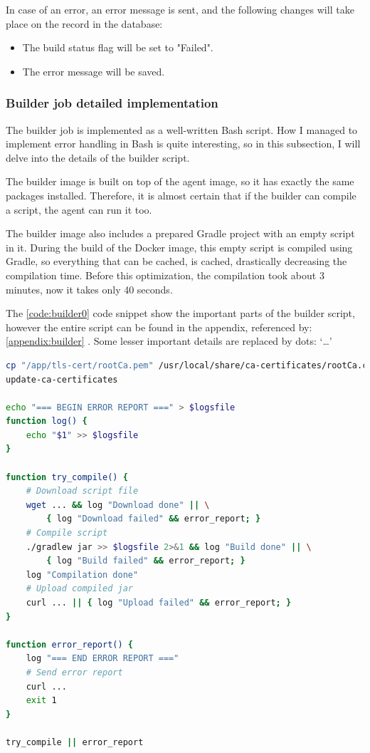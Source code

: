 In case of an error, an error message is sent, and the following changes will take place on the record in the database:

\begin{itemize}
    \item The build status flag will be set to "Failed".
    \item The error message will be saved.
\end{itemize}

\subsubsection{Builder job detailed implementation}

The builder job is implemented as a well-written Bash script. How I managed to implement error handling in Bash is quite interesting, so in this subsection, I will delve into the details of the builder script.

The builder image is built on top of the agent image, so it has exactly the same packages installed. Therefore, it is almost certain that if the builder can compile a script, the agent can run it too.

The builder image also includes a prepared Gradle project with an empty script in it. During the build of the Docker image, this empty script is compiled using Gradle, so everything that can be cached, is cached, drastically decreasing the compilation time. Before this optimization, the compilation took about 3 minutes, now it takes only 40 seconds.

The \ref{code:builder0} code snippet show the important parts of the builder script, however the entire script can be found in the appendix, referenced by: \ref{appendix:builder} . Some lesser important details are replaced by dots: `\dots'

\begin{lstlisting}[caption={Builder script},language=bash,label=code:builder0]
cp "/app/tls-cert/rootCa.pem" /usr/local/share/ca-certificates/rootCa.crt
update-ca-certificates

echo "=== BEGIN ERROR REPORT ===" > $logsfile
function log() {
    echo "$1" >> $logsfile
}
    
function try_compile() {
    # Download script file
    wget ... && log "Download done" || \
        { log "Download failed" && error_report; }
    # Compile script
    ./gradlew jar >> $logsfile 2>&1 && log "Build done" || \
        { log "Build failed" && error_report; }
    log "Compilation done"
    # Upload compiled jar
    curl ... || { log "Upload failed" && error_report; }
}

function error_report() {
    log "=== END ERROR REPORT ==="
    # Send error report
    curl ...
    exit 1
}

try_compile || error_report
\end{lstlisting}

